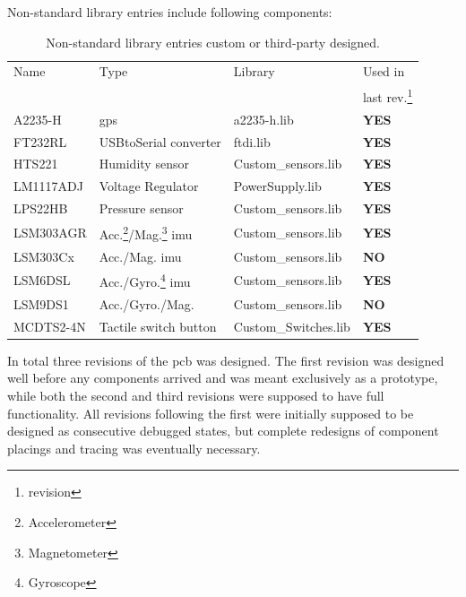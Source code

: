 Non-standard library entries include following components:\\
\begin{minipage}{\linewidth}
\begin{table}[H]
\centering
	\begin{tabular}{ l | l | l | l }
 	Name		& Type 								& Library 				& Used in         \\
 			&									&					& last rev.\footnote{revision}\\
	\hline
  	A2235-H  	& \gls{gps} 								& a2235-h.lib 			& \textbf{YES}\\
  	FT232RL 	& USBtoSerial converter 						& ftdi.lib\cite{ftdi}			& \textbf{YES}\\
  	HTS221 	& Humidity sensor 							& Custom\_sensors.lib 		& \textbf{YES}\\
  	LM1117ADJ 	& Voltage Regulator						& PowerSupply.lib\cite{lm1117} 	& \textbf{YES}\\
  	LPS22HB 	& Pressure sensor  							& Custom\_sensors.lib 		& \textbf{YES}\\
  	LSM303AGR	& Acc.\footnote{Accelerometer}/Mag.\footnote{Magnetometer} \gls{imu} & Custom\_sensors.lib & \textbf{YES}\\
  	LSM303Cx 	& Acc./Mag. \gls{imu} 						& Custom\_sensors.lib		& \textbf{NO} \\
  	LSM6DSL 	& Acc./Gyro.\footnote{Gyroscope} \gls{imu} 			& Custom\_sensors.lib 		& \textbf{YES}\\
  	LSM9DS1 	& Acc./Gyro./Mag. 							& Custom\_sensors.lib 		& \textbf{NO} \\
  	MCDTS2-4N 	& Tactile switch button 						& Custom\_Switches.lib 		& \textbf{YES}\\
\end{tabular}
\caption{Non-standard library entries custom or third-party designed.}
\label{table:nstdlibs}
\end{table}
\end{minipage}
\vspace{.5cm}

In total three revisions of the \gls{pcb} was designed. The first revision was designed well before any components arrived and was meant exclusively as a prototype, while both the second and third revisions were supposed to have full functionality. All revisions following the first were initially supposed to be designed as consecutive debugged states, but complete redesigns of component placings and tracing was eventually necessary.

